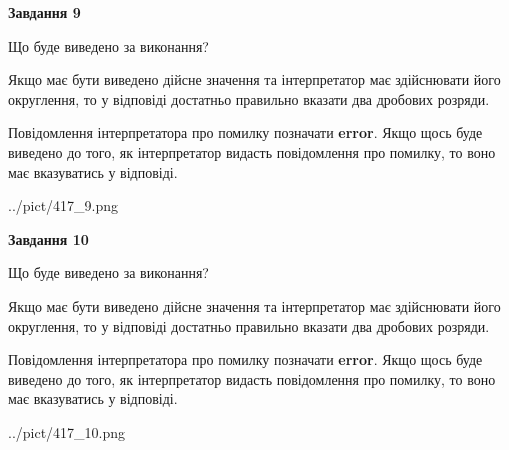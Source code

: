 \documentclass[12pt, ukrainian]{article}
\begin{document}
{\begin {Large}
{\begin {center}\textbf{Завдання 9}\end {center}}\par
Що буде виведено за виконання? \par

Якщо має бути виведено дійсне значення та інтерпретатор має здійснювати його округлення, 
то у відповіді достатньо правильно вказати два дробових розряди.

Повідомлення інтерпретатора про помилку позначати \textbf{error}.
Якщо щось буде виведено до того, як інтерпретатор видасть повідомлення про помилку, 
то воно має вказуватись у відповіді. \par

\begin{center}
	{../pict/417_9.png}
\end{center}
\newpage

{\begin {center}\textbf{Завдання 10}\end {center}}\par
Що буде виведено за виконання? \par

Якщо має бути виведено дійсне значення та інтерпретатор має здійснювати його округлення, 
то у відповіді достатньо правильно вказати два дробових розряди.

Повідомлення інтерпретатора про помилку позначати \textbf{error}.
Якщо щось буде виведено до того, як інтерпретатор видасть повідомлення про помилку, 
то воно має вказуватись у відповіді. \par

\begin{center}
	{../pict/417_10.png}
\end{center}
\newpage

\end {Large}}
\end{document}
